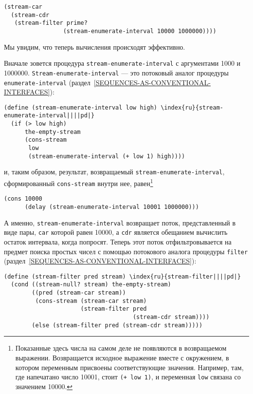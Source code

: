 \begin{Verbatim}[fontsize=\small]
(stream-car
  (stream-cdr
   (stream-filter prime?
                 (stream-enumerate-interval 10000 1000000))))
\end{Verbatim}

Мы увидим, что теперь вычисления происходят эффективно.

Вначале зовется процедура {\tt stream-enumerate-interval} с
аргументами 1000 и 1000000. {\tt Stream-enumerate-interval} ---
это потоковый аналог процедуры {\tt enumerate-interval} %
(раздел~\ref{SEQUENCES-AS-CONVENTIONAL-INTERFACES}):

\begin{Verbatim}[fontsize=\small]
(define (stream-enumerate-interval low high) \index{ru}{stream-enumerate-interval||||pd|}
  (if (> low high)
      the-empty-stream
      (cons-stream
       low
       (stream-enumerate-interval (+ low 1) high))))
\end{Verbatim}
и, таким образом, результат, возвращаемый
{\tt stream-enumerate-in\-ter\-val}, \linebreak
сфор\-ми\-ро\-ванный {\tt cons-stream} внутри нее, равен\footnote{Показанные здесь числа на самом деле не появляются в
возвращаемом выражении.  Возвращается исходное выражение вместе с
окружением, в котором переменным присвоены соответствующие значения.
Например, там, где напечатано число 10001, стоит {\tt (+ low
1)}, и переменная {\tt low} связана со значением
10000.
}

\begin{Verbatim}[fontsize=\small]
(cons 10000
      (delay (stream-enumerate-interval 10001 1000000)))
\end{Verbatim}

А именно, {\tt stream-enumerate-interval} возвращает поток,
представленный в виде пары, {\tt car} которой равен 10000,
а {\tt cdr} является обещанием вычислить остаток интервала,
когда попросят.  Теперь этот поток отфильтровывается на предмет поиска
простых чисел с помощью потокового аналога процедуры
{\tt filter} (раздел~\ref{SEQUENCES-AS-CONVENTIONAL-INTERFACES}):

\begin{Verbatim}[fontsize=\small]
(define (stream-filter pred stream) \index{ru}{stream-filter||||pd|}
  (cond ((stream-null? stream) the-empty-stream)
        ((pred (stream-car stream))
         (cons-stream (stream-car stream)
                      (stream-filter pred
                                     (stream-cdr stream))))
        (else (stream-filter pred (stream-cdr stream)))))
\end{Verbatim}

